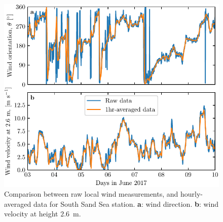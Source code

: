 \begin{figure}[p]
\centering
\includegraphics[scale=1]{Figures/Figure3_supp.pdf}
\caption{Comparison between raw local wind measurements, and hourly-averaged data for South Sand Sea station. \textbf{a}: wind direction. \textbf{b}: wind velocity at height $2.6$~m.}
\label{Fig3_supp}
\end{figure}

